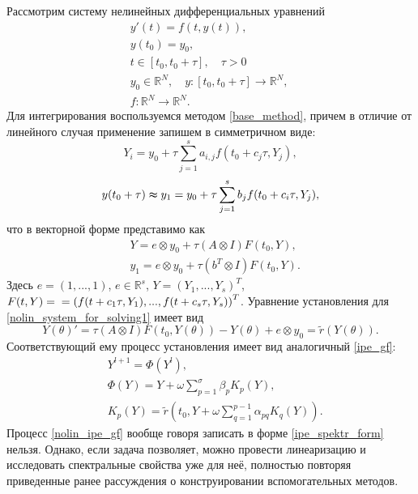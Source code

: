 \documentclass[a4paper, 14pt]{extreport} %
\begin{document}
Рассмотрим систему нелинейных дифференциальных уравнений
\begin{equation}
\begin{aligned}
\label{nolin_main_problem}
&y'(t)=f(t, y(t)),\\
&y(t_0)=y_0,\\
&t \in [t_0, t_0+\tau],\quad \tau>0 \\
&y_0\in \mathbb{R}^N,\quad
y:[t_0,t_0+\tau] \to \mathbb{R}^N,\quad\\
&f:  \mathbb{R}^N \to \mathbb{R}^N.
\end{aligned}
\end{equation}
Для интегрирования воспользуемся методом \eqref{base_method}, причем
в отличие от линейного случая применение запишем в симметричном
виде:
$$Y_i = y_0+\tau \sum_{j = 1}^s a_{i,j}f(t_0+c_j \tau,Y_j), $$
$$y(t_0+\tau)\thickapprox y_1 = y_0 + \tau \sum_{j = 1}^s b_{j}f(t_0+c_i \tau,Y_j),$$
что в векторной форме представимо как
\begin{equation}
\begin{aligned}
\label{nolin_system_for_solving1}
&Y = e\otimes y_0 +\tau (A\otimes I)F(t_0,Y),\\
&y_1 = e\otimes y_0 +\tau(b^T\otimes I)F(t_0,Y).
\end{aligned}
\end{equation}
Здесь $e = (1,..., 1)$, $e \in \mathbb R^s$,  $Y = (Y_1, ...,Y_s)^T$,
 $F(t, Y) =\\= \left(f(t+c_1 \tau,Y_1),..., f(t+c_s \tau,Y_s) \right)^T$.
Уравнение установления для \eqref{nolin_system_for_solving1} имеет вид
\begin{equation}
\label{nolin_estEquation} Y(\theta)'=\tau (A\otimes
I)F(t_0,Y(\theta)) -Y(\theta)+ e\otimes y_0 = \tilde r(Y(\theta)).
\end{equation}
Соответствующий ему процесс установления имеет вид аналогичный \eqref{ipe_gf}:
\begin{equation}
\label{nolin_ipe_gf}
\begin{aligned}
&Y^{l+1}=\Phi(Y^{l}),\\
&\Phi(Y)=Y+\omega \sum_{p=1}^{\sigma}\beta_{p}K_p(Y),\\
&K_p(Y)=\tilde r(t_0,Y+\omega \sum_{q=1}^{p-1}\alpha_{pq}K_q(Y)).
\end{aligned}
\end{equation}
Процесс \eqref{nolin_ipe_gf} вообще говоря записать в форме \eqref{ipe_spektr_form} нельзя. Однако, если задача позволяет, можно провести линеаризацию и исследовать спектральные свойства уже для неё,  полностью повторяя приведенные ранее рассуждения о конструировании вспомогательных методов.
\end{document}
